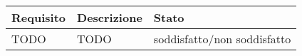 \begin{center}

	\def\arraystretch{1.5}
	\bgroup
	\begin{longtable}{| p{2.5cm} | p{8cm} | p{3.5cm} |}

		\hline
		\textbf{Requisito} & \textbf{Descrizione} & \textbf{Stato} \\
		\hline
		TODO & TODO & soddisfatto/non soddisfatto
		\hline
	\end{longtable}
	\egroup
\end{center}